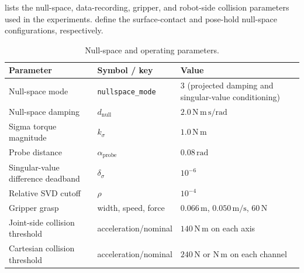  lists the null-space, data-recording,
gripper, and robot-side collision parameters used in the experiments.
define the surface-contact and pose-hold null-space configurations,
respectively.

\begin{table}[H]
\centering
\caption{Null-space and operating parameters.}
\label{tab:nullspace_safety_parameters}
\small
\begin{tabular}{@{}
>{\raggedright\arraybackslash}p{}
>{\raggedright\arraybackslash}p{}
>{\raggedright\arraybackslash}p{}@{}}
\toprule
Parameter & Symbol / key & Value \\
\midrule
Null-space mode & \texttt{nullspace\_mode} &
  \(3\) (projected damping and singular-value conditioning) \\
Null-space damping & \(d_{\mathrm{null}}\) & \(2.0\,\mathrm{N\,m\,s/rad}\) \\
Sigma torque magnitude & \(k_\sigma\) &
  \(1.0\,\mathrm{N\,m}\) \\
Probe distance & \(\alpha_{\mathrm{probe}}\) & \(0.08\,\mathrm{rad}\) \\
Singular-value difference deadband & \(\delta_\sigma\) & \(10^{-6}\) \\
Relative SVD cutoff & \(\rho\) & \(10^{-4}\) \\
Gripper grasp & width, speed, force &
  \(0.066\,\mathrm{m}\), \(0.050\,\mathrm{m/s}\), \(60\,\mathrm{N}\) \\
Joint-side collision threshold & acceleration/nominal &
  \(140\,\mathrm{N\,m}\) on each axis \\
Cartesian collision threshold & acceleration/nominal &
  \(240\,\mathrm{N}\) or \(\mathrm{N\,m}\) on each channel \\
\bottomrule
\end{tabular}
\end{table}
